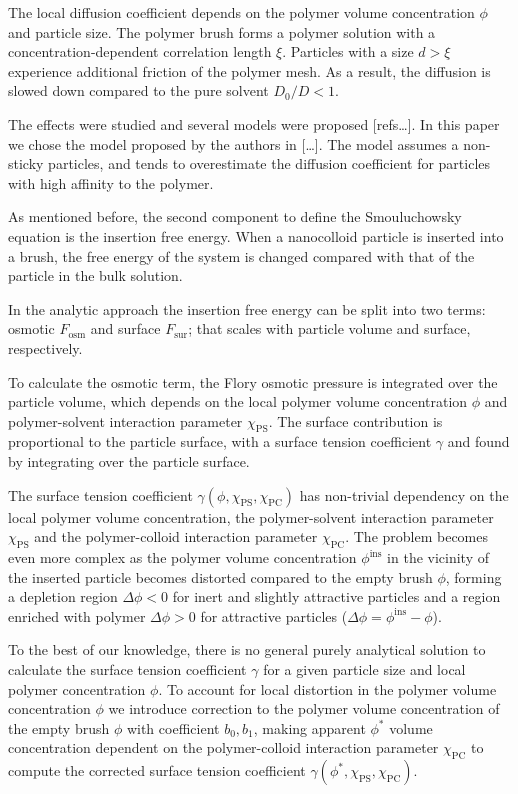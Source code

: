 \documentclass[12pt, a4paper]{article}
\begin{document}
The local diffusion coefficient depends on the polymer volume concentration $\phi$ and particle size. 
The polymer brush forms a polymer solution with a concentration-dependent correlation length $\xi$. 
Particles with a size $d>\xi$ experience additional friction of the polymer mesh. 
As a result, the diffusion is slowed down compared to the pure solvent $D_0/D<1$.

The effects were studied and several models were proposed [refs\dots]. 
In this paper we chose the model proposed by the authors in [\dots].
The model assumes a non-sticky particles, and tends to overestimate the diffusion coefficient for particles with high affinity to the polymer.

As mentioned before, the second component to define the Smouluchowsky equation is the insertion free energy. 
When a nanocolloid particle is inserted into a brush, the free energy of the system is changed compared with that of the particle in the bulk solution. 

In the analytic approach the insertion free energy can be split into two terms: osmotic $F_{\textrm{osm}}$ and surface $F_{\textrm{sur}}$; that scales with particle volume and surface, respectively.

To calculate the osmotic term, the Flory osmotic pressure is integrated over the particle volume, which depends on the local polymer volume concentration $\phi$ and polymer-solvent interaction parameter $\chi_{\textrm{PS}}$.
The surface contribution is proportional to the particle surface, with a surface tension coefficient $\gamma$ and found by integrating over the particle surface.

The surface tension coefficient $\gamma(\phi, \chi_{\textrm{PS}}, \chi_{\textrm{PC}})$ has non-trivial dependency on the local polymer volume concentration, the polymer-solvent interaction parameter $\chi_{\textrm{PS}}$ and the polymer-colloid interaction parameter $\chi_{\textrm{PC}}$.
The problem becomes even more complex as the polymer volume concentration $\phi^{\textrm{ins}}$ in the vicinity of the inserted particle becomes distorted compared to the empty brush $\phi$, forming a depletion region $\Delta \phi <0$ for inert and slightly attractive particles and a region enriched with polymer $\Delta \phi >0$ for attractive particles ($\Delta \phi = \phi^{\textrm{ins}} - \phi$).

To the best of our knowledge, there is no general purely analytical solution to calculate the surface tension coefficient $\gamma$ for a given particle size and local polymer concentration $\phi$.
To account for local distortion in the polymer volume concentration $\phi$ we introduce correction to the polymer volume concentration of the empty brush $\phi$ with coefficient $b_0, b_1$, making apparent $\phi^{\ast}$ volume concentration dependent on the polymer-colloid interaction parameter $\chi_{\textrm{PC}}$ to compute the corrected surface tension coefficient $\gamma(\phi^{\ast},\chi_{\textrm{PS}}, \chi_{\textrm{PC}})$.
\end{document}
